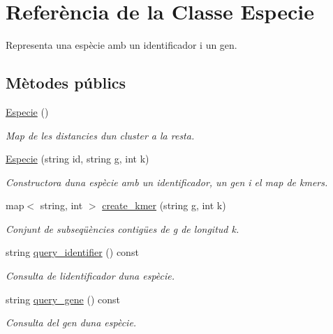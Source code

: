 \hypertarget{class_especie}{}\section{Referència de la Classe Especie}
\label{class_especie}


Representa una espècie amb un identificador i un gen.  


\subsection*{Mètodes públics}
\begin{DoxyCompactItemize}
\item 
\hyperlink{class_especie_a272c2488719cc9874b2f174906675b3d}{Especie} ()
\begin{DoxyCompactList}\small\item\em Map de les distancies d\textquotesingle{}un cluster a la resta. \end{DoxyCompactList}\item 
\hyperlink{class_especie_a00df4e464c347052383d92d310f68791}{Especie} (string id, string g, int k)
\begin{DoxyCompactList}\small\item\em Constructora d\textquotesingle{}una espècie amb un identificador, un gen i el map de kmers. \end{DoxyCompactList}\item 
map$<$ string, int $>$ \hyperlink{class_especie_a7e6c7615ab5458259c1f20bcd68ebd80}{create\+\_\+kmer} (string g, int k)
\begin{DoxyCompactList}\small\item\em Conjunt de subseqüències contigües de g de longitud k. \end{DoxyCompactList}\item 
string \hyperlink{class_especie_acfce0335ac5432dc681c2931b7986ace}{query\+\_\+identifier} () const
\begin{DoxyCompactList}\small\item\em Consulta de l\textquotesingle{}identificador d\textquotesingle{}una espècie. \end{DoxyCompactList}\item 
string \hyperlink{class_especie_a0781a594e45e036c0b59d161a7ebd8f3}{query\+\_\+gene} () const
\begin{DoxyCompactList}\small\item\em Consulta del gen d\textquotesingle{}una espècie. \end{DoxyCompactList}\item 

\end{DoxyCompactItemize}

